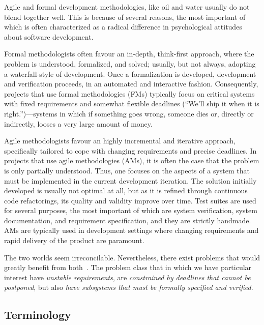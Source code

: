 \documentclass[english]{lni}
\begin{document}

Agile and formal development methodologies, like oil and water
usually do not blend together well.  This is because of several
reasons, the most important of which is often characterized as a
radical difference in psychological attitudes about software
development.  

Formal methodologists often favour an in-depth, think-first approach,
where the problem is understood, formalized, and solved; usually, but
not always, adopting a waterfall-style of development.  Once a
formalization is developed, development and verification proceeds, in
an automated and interactive fashion.  Consequently, projects that use
formal methodologies (FMs) typically focus on critical systems with
fixed requirements and somewhat flexible deadlines (``We'll ship it
when it is right.'')---systems in which if something goes wrong,
someone dies or, directly or indirectly, looses a very large amount of
money.

Agile methodologists favour an highly incremental and iterative
approach, specifically tailored to cope with changing requirements and
precise deadlines.  In projects that use agile methodologies (AMs), it is
often the case that the problem is only partially understood.  Thus,
one focuses on the aspects of a system that must be implemented in the
current development iteration.  The solution initially developed is
usually not optimal at all, but as it is refined through continuous
code refactorings, its quality and validity improve over time.  Test
suites are used for several purposes, the most important of which are
system verification, system documentation, and requirement
specification, and they are strictly handmade.  AMs are typically used
in development settings where changing requirements and rapid delivery
of the product are paramount.


The two worlds seem irreconcilable.  Nevertheless, there exist
problems that would greatly benefit from both~\cite{Black2009}.  The
problem class that in which we have particular interest have
\emph{unstable requirements}, are \emph{constrained by deadlines that
  cannot be postponed}, but also \emph{have subsystems that must be
  formally specified and verified}.


\subsection{Terminology}
\label{sec:terminology}
\end{document}
